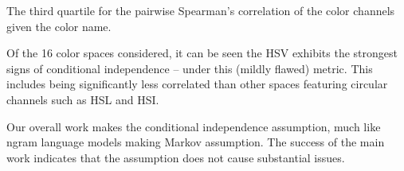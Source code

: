 \documentclass[11pt,letterpaper]{article}
\begin{document}

\begin{table}
	\centering
	\caption{\label{tbl:colorcor} The third quartile for the pairwise Spearman's correlation of the color channels given the color name.}

\end{table}

Of the 16 color spaces considered, it can be seen the HSV exhibits the strongest signs of conditional independence -- under this (mildly flawed) metric.
This includes being significantly less correlated than other spaces featuring circular channels such as HSL and HSI.

Our overall work makes the conditional independence assumption, much like ngram language models making Markov assumption.
The success of the main work indicates that the assumption does not cause substantial issues.
\end{document}

